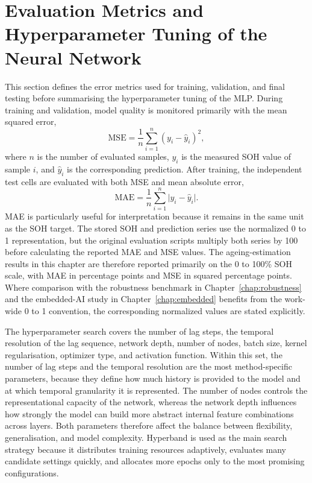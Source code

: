 \documentclass[
    a4paper,
    12pt,
    titlepage,
    bibliography=totoc,
    twoside=on,
    parskip=false,
    numbers=noenddot,
    cleardoublepage=empty,
    DIV=12,
    BCOR=12.0mm,
    headheight=36pt,
    headings=openright
]{scrreprt}
\begin{document}
\section{Evaluation Metrics and Hyperparameter Tuning of the Neural Network}
This section defines the error metrics used for training, validation, and final testing before summarising the hyperparameter tuning of the MLP. During training and validation, model quality is monitored primarily with the mean squared error,
\begin{equation}
\mathrm{MSE} = \frac{1}{n} \sum_{i=1}^{n}(y_i - \hat{y}_i)^2 ,
\end{equation}
where $n$ is the number of evaluated samples, $y_i$ is the measured SOH value of sample $i$, and $\hat{y}_i$ is the corresponding prediction. After training, the independent test cells are evaluated with both MSE and mean absolute error,
\begin{equation}
\mathrm{MAE} = \frac{1}{n} \sum_{i=1}^{n} \lvert y_i - \hat{y}_i \rvert .
\end{equation}
MAE is particularly useful for interpretation because it remains in the same unit as the SOH target. The stored SOH and prediction series use the normalized 0 to 1 representation, but the original evaluation scripts multiply both series by 100 before calculating the reported MAE and MSE values. The ageing-estimation results in this chapter are therefore reported primarily on the 0 to 100\% SOH scale, with MAE in percentage points and MSE in squared percentage points. Where comparison with the robustness benchmark in Chapter~\ref{chap:robustness} and the embedded-AI study in Chapter~\ref{chap:embedded} benefits from the work-wide 0 to 1 convention, the corresponding normalized values are stated explicitly.

The hyperparameter search covers the number of lag steps, the temporal resolution of the lag sequence, network depth, number of nodes, batch size, kernel regularisation, optimizer type, and activation function. Within this set, the number of lag steps and the temporal resolution are the most method-specific parameters, because they define how much history is provided to the model and at which temporal granularity it is represented. The number of nodes controls the representational capacity of the network, whereas the network depth influences how strongly the model can build more abstract internal feature combinations across layers. Both parameters therefore affect the balance between flexibility, generalisation, and model complexity. Hyperband is used as the main search strategy because it distributes training resources adaptively, evaluates many candidate settings quickly, and allocates more epochs only to the most promising configurations.\autocite{liHyperbandNovelBanditBased2016}
\end{document}
